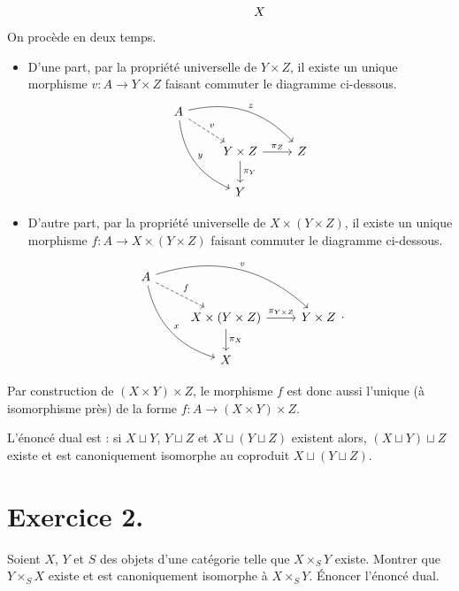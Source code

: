 \documentclass{../../td}
\begin{document}
\begin{enumerate}
\[\begin{tikzcd}
        && X
      \end{tikzcd}
      \]
      On procède en deux temps.
      \begin{itemize}
        \item D'une part, par la propriété universelle de $Y \times Z$, il existe un unique morphisme $v : A \to Y \times Z$ faisant commuter le diagramme ci-dessous.
          \[
          \begin{tikzcd}
            A \arrow[bend left]{drr}{z} \arrow[bend right]{ddr}{y} \arrow[dashed]{dr}{v}\\
            & Y \times Z \arrow{d}{\pi_Y}\arrow{r}{\pi_Z} & Z\\
            & Y 
          \end{tikzcd}
          \] 
        \item D'autre part, par la propriété universelle de $X \times (Y \times Z)$, il existe un unique morphisme $f : A \to X \times (Y \times Z)$ faisant commuter le diagramme ci-dessous.
          \[
          \begin{tikzcd}
            A \arrow[bend left]{drr}{v} \arrow[bend right]{ddr}{x} \arrow[dashed]{dr}{f}\\
            & X \times (Y \times Z) \arrow{d}{\pi_X}\arrow{r}{\pi_{Y \times Z}} & Y \times Z\\
            & X 
          \end{tikzcd}
          .\]
      \end{itemize}
      Par construction de $(X \times Y) \times Z$, le morphisme $f$ est donc aussi l'unique (à isomorphisme près) de la forme $f : A \to (X \times Y) \times Z$.

      L'énoncé dual est : si $X \sqcup Y$, $Y \sqcup Z$ et $X \sqcup (Y \sqcup Z)$ existent alors, $(X \sqcup Y) \sqcup Z$ existe et est canoniquement isomorphe au coproduit $X \sqcup (Y \sqcup Z)$.
  \end{enumerate}

  \chapter{Exercice 2.}
  \begin{slshape}
    \color{deepblue}
    Soient $X$, $Y$ et $S$ des objets d'une catégorie telle que $X \times_S Y$ existe.
    Montrer que $Y \times_S X$ existe et est canoniquement isomorphe à $X \times_S Y$.
    Énoncer l'énoncé dual.
  \end{slshape}
\end{document}
